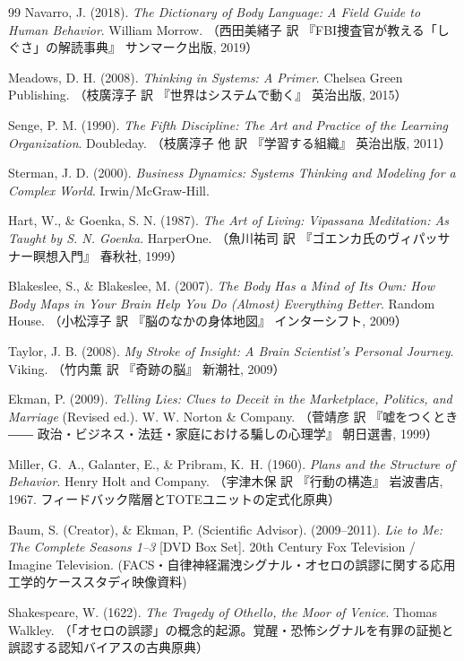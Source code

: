 \begin{thebibliography}{99}
Navarro, J. (2018). \textit{The Dictionary of Body Language: A Field Guide to Human Behavior}. William Morrow. （西田美緒子 訳 『FBI捜査官が教える「しぐさ」の解読事典』 サンマーク出版, 2019）

Meadows, D. H. (2008). \textit{Thinking in Systems: A Primer}. Chelsea Green Publishing. （枝廣淳子 訳 『世界はシステムで動く』 英治出版, 2015）

Senge, P. M. (1990). \textit{The Fifth Discipline: The Art and Practice of the Learning Organization}. Doubleday. （枝廣淳子 他 訳 『学習する組織』 英治出版, 2011）

Sterman, J. D. (2000). \textit{Business Dynamics: Systems Thinking and Modeling for a Complex World}. Irwin/McGraw-Hill.

Hart, W., \& Goenka, S. N. (1987). \textit{The Art of Living: Vipassana Meditation: As Taught by S. N. Goenka}. HarperOne. （魚川祐司 訳 『ゴエンカ氏のヴィパッサナー瞑想入門』 春秋社, 1999）

Blakeslee, S., \& Blakeslee, M. (2007). \textit{The Body Has a Mind of Its Own: How Body Maps in Your Brain Help You Do (Almost) Everything Better}. Random House. （小松淳子 訳 『脳のなかの身体地図』 インターシフト, 2009）

Taylor, J. B. (2008). \textit{My Stroke of Insight: A Brain Scientist's Personal Journey}. Viking. （竹内薫 訳 『奇跡の脳』 新潮社, 2009）

Ekman, P. (2009). \textit{Telling Lies: Clues to Deceit in the Marketplace, Politics, and Marriage} (Revised ed.). W. W. Norton \& Company. （菅靖彦 訳 『嘘をつくとき ―― 政治・ビジネス・法廷・家庭における騙しの心理学』 朝日選書, 1999）


Miller, G.~A., Galanter, E., \& Pribram, K.~H. (1960). \textit{Plans and the Structure of Behavior}. Henry Holt and Company. （宇津木保 訳 『行動の構造』 岩波書店, 1967. フィードバック階層とTOTEユニットの定式化原典）

Baum, S. (Creator), \& Ekman, P. (Scientific Advisor). (2009--2011). \textit{Lie to Me: The Complete Seasons 1--3} [DVD Box Set]. 20th Century Fox Television / Imagine Television. (FACS・自律神経漏洩シグナル・オセロの誤謬に関する応用工学的ケーススタディ映像資料)

Shakespeare, W. (1622). \textit{The Tragedy of Othello, the Moor of Venice}. Thomas Walkley. （「オセロの誤謬」の概念的起源。覚醒・恐怖シグナルを有罪の証拠と誤認する認知バイアスの古典原典）



\end{thebibliography}
